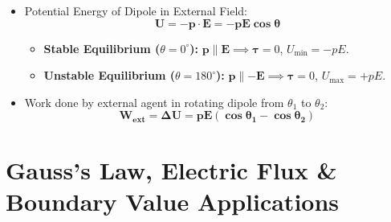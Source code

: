 \documentclass[10pt,a4paper]{article}
\begin{document}
\begin{formulabox}
\begin{itemize}
\begin{equation}
    \mathbf{\boldsymbol{\tau} = \mathbf{p} \times \mathbf{E}} \implies |\boldsymbol{\tau}| = p E \sin\theta
  \end{equation}
  Maximum torque occurs at $\theta = 90^\circ$ ($\tau_{\max} = pE$).
  \item Potential Energy of Dipole in External Field:
  \begin{equation}
    \mathbf{U = -\mathbf{p}\cdot\mathbf{E} = -p E \cos\theta}
  \end{equation}
  \begin{itemize}
    \item \textbf{Stable Equilibrium ($\theta = 0^\circ$):} $\mathbf{p} \parallel \mathbf{E} \implies \boldsymbol{\tau} = 0$, $U_{\min} = -pE$.
    \item \textbf{Unstable Equilibrium ($\theta = 180^\circ$):} $\mathbf{p} \parallel -\mathbf{E} \implies \boldsymbol{\tau} = 0$, $U_{\max} = +pE$.
  \end{itemize}
  \item Work done by external agent in rotating dipole from $\theta_1$ to $\theta_2$:
  \begin{equation}
    \mathbf{W_{\text{ext}} = \Delta U = p E (\cos\theta_1 - \cos\theta_2)}
  \end{equation}
\end{itemize}
\end{formulabox}

\section{Gauss's Law, Electric Flux \& Boundary Value Applications}
\end{document}
